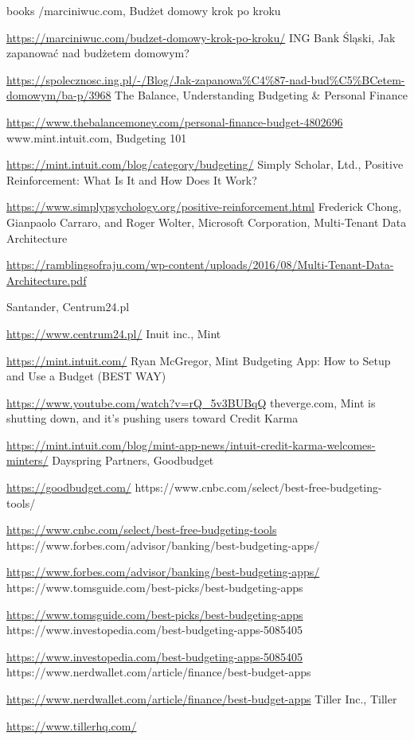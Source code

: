 \documentclass[a4paper,10pt, twoside]{report}
\begin{document}
\begin{large}
\begin{thebibliography} {books}
     /marciniwuc.com, Budżet domowy krok po kroku \raggedright\url{
        https://marciniwuc.com/budzet-domowy-krok-po-kroku/}
     ING Bank Śląski, Jak zapanować nad budżetem domowym? \raggedright\url{
        https://spolecznosc.ing.pl/-/Blog/Jak-zapanowa\%C4\%87-nad-bud\%C5\%BCetem-domowym/ba-p/3968}
     The Balance, Understanding Budgeting \& Personal Finance\raggedright\url{
        https://www.thebalancemoney.com/personal-finance-budget-4802696}
     www.mint.intuit.com, Budgeting 101 \raggedright\url{
        https://mint.intuit.com/blog/category/budgeting/}
     Simply Scholar, Ltd., Positive Reinforcement: What Is It and How Does It Work? \raggedright\url{
        https://www.simplypsychology.org/positive-reinforcement.html}
     Frederick Chong, Gianpaolo Carraro, and Roger Wolter, Microsoft Corporation, Multi‐Tenant Data Architecture \raggedright\url{
        https://ramblingsofraju.com/wp-content/uploads/2016/08/Multi-Tenant-Data-Architecture.pdf}
        

     Santander, Centrum24.pl \raggedright\url{
        https://www.centrum24.pl/}
     Inuit inc., Mint \raggedright\url{
        https://mint.intuit.com/}
     Ryan McGregor, Mint Budgeting App: How to Setup and Use a Budget (BEST WAY) \raggedright\url{
        https://www.youtube.com/watch?v=rQ_5v3BUBqQ}
     theverge.com, Mint is shutting down, and it’s pushing users toward Credit Karma \raggedright\url{
        https://mint.intuit.com/blog/mint-app-news/intuit-credit-karma-welcomes-minters/}
     Dayspring Partners, Goodbudget \raggedright\url{
        https://goodbudget.com/}
     https://www.cnbc.com/select/best-free-budgeting-tools/ \raggedright\url{
        https://www.cnbc.com/select/best-free-budgeting-tools}
     https://www.forbes.com/advisor/banking/best-budgeting-apps/ \raggedright\url{
        https://www.forbes.com/advisor/banking/best-budgeting-apps/}
     https://www.tomsguide.com/best-picks/best-budgeting-apps \raggedright\url{
        https://www.tomsguide.com/best-picks/best-budgeting-apps}
     https://www.investopedia.com/best-budgeting-apps-5085405 \raggedright\url{
        https://www.investopedia.com/best-budgeting-apps-5085405}
     https://www.nerdwallet.com/article/finance/best-budget-apps \raggedright\url{
        https://www.nerdwallet.com/article/finance/best-budget-apps}
     Tiller Inc., Tiller \raggedright\url{
        https://www.tillerhq.com/}
       


\end{thebibliography}
\end{large}
\end{document}
